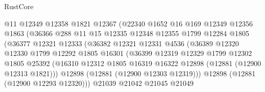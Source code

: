 \begin{lexlean}{RustCore}
\begin{coremodule}
                              @11
                              @12349
                              @12358
                              @1821
                              @12367
                              (@22340
                                @1652
                                @16
                                @169
                                @12349
                                @12356
                                @1863
                                (@36366
                                  @288
                                  @11
                                  @15
                                  @12335
                                  @12348
                                  @12355
                                  @1799
                                  @12284
                                  @1805
                                  (@36377
                                    @12321
                                    @12333
                                    (@36382
                                      @12321
                                      @12331
                                      @4536
                                      (@36389
                                        @12320
                                        @12330
                                        @1799
                                        @12292
                                        @1805
                                        @16301
                                        (@36399
                                          @12319
                                          @12329
                                          @1799
                                          @12302
                                          @1805
                                          @25392
                                          (@16310
                                            @12312
                                            @1805
                                            @16319
                                            @16322
                                            @12898
                                            (@12881 (@12900 @12313 @1821)))
                                          @12898
                                          (@12881 (@12900 @12303 @12319)))
                                        @12898
                                        (@12881 (@12900 @12293 @12320)))
                                      @21039
                                      @21042
                                      @21045
                                      @21049

\end{coremodule}
\end{lexlean}
